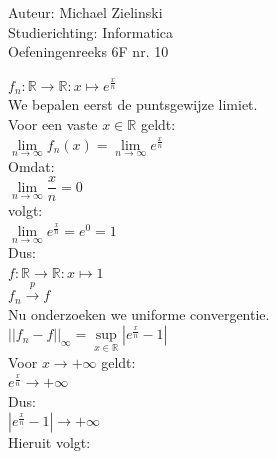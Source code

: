 \documentclass[a4paper]{article}
\begin{document}
  
\noindent \large Auteur: Michael Zielinski \\
\noindent \large Studierichting: Informatica\\
\noindent \large Oefeningenreeks 6F nr. 10\\

\medskip

\normalsize

$ f_n:\mathbb{R}\rightarrow\mathbb{R}:x\mapsto e^{\tfrac{x}{n}} $ \\

We bepalen eerst de puntsgewijze limiet. \\

Voor een vaste $x\in\mathbb{R}$ geldt: \\

$ \lim\limits_{n\rightarrow\infty} f_n(x)
= \lim\limits_{n\rightarrow\infty} e^{\tfrac{x}{n}} $ \\

Omdat: \\

$ \lim\limits_{n\rightarrow\infty}\dfrac{x}{n}=0 $ \\

volgt: \\

$ \lim\limits_{n\rightarrow\infty} e^{\tfrac{x}{n}}=e^0=1 $ \\

Dus: \\

$ f:\mathbb{R}\rightarrow\mathbb{R}:x\mapsto 1 $ \\

$ f_n \stackrel{p}{\rightarrow} f $ \\

Nu onderzoeken we uniforme convergentie. \\

$ \left|\left|f_n-f\right|\right|_{\infty}
= \sup\limits_{x\in\mathbb{R}}\left|e^{\tfrac{x}{n}}-1\right| $ \\

Voor $x\rightarrow+\infty$ geldt: \\

$ e^{\tfrac{x}{n}}\rightarrow+\infty $ \\

Dus: \\

$ \left|e^{\tfrac{x}{n}}-1\right|\rightarrow+\infty $ \\

Hieruit volgt: \\
\end{document}
